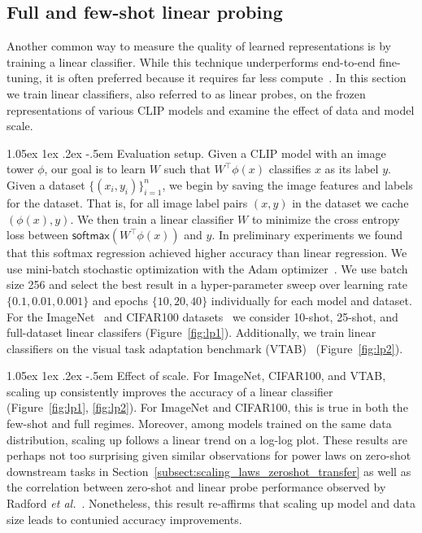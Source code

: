 \documentclass[11pt,table]{article}
\makeatletter
\renewcommand\paragraph{\@startsection{paragraph}{4}{\z@}                                     {1.05ex \@plus1ex \@minus.2ex}                                {-.5em}
{\normalfont\normalsize\bfseries}}
\makeatother
\begin{document}
\subsection{Full and few-shot linear probing}
\label{subsect:scaling_laws_linearprobe}

Another common way to measure the quality of learned representations is by training a linear classifier.
While this technique underperforms end-to-end fine-tuning, it is often preferred because it requires far less compute~\cite{kornblith2019better, radford2021learning}.
In this section we train linear classifiers, also referred to as linear probes, on the frozen representations of various CLIP models and examine the effect of data and model scale.

\paragraph{Evaluation setup.}
Given a CLIP model with an image tower $\phi$, our goal is to learn $W$ such that $W^\top\phi(x)$ classifies $x$ as its label $y$.
Given a dataset $\{(x_i,y_i)\}_{i=1}^n$, we begin by saving the image features and labels for the dataset.
That is, for all image label pairs $(x, y)$ in the dataset we cache $(\phi(x), y)$.
We then train a linear classifier $W$ to minimize the cross entropy loss between $\mathsf{softmax}\left(W^\top \phi(x) \right)$ and $y$.
In preliminary experiments we found that this softmax regression achieved higher accuracy than linear regression.
We use mini-batch stochastic optimization with the Adam optimizer~\cite{kingma2014adam}.
We use batch size 256 and select the best result in a hyper-parameter sweep over learning rate $\{0.1, 0.01, 0.001\}$ and epochs $\{10, 20, 40\}$ individually for each model and dataset.
For the ImageNet~\cite{Deng2009a} and CIFAR100 datasets~\cite{Krizhevsky2009} we consider 10-shot, 25-shot, and full-dataset linear classifers (Figure~\ref{fig:lp1}).
Additionally, we train linear classifiers on the visual task adaptation benchmark (VTAB)~\cite{zhai2019large} (Figure~\ref{fig:lp2}).

\paragraph{Effect of scale.}
For ImageNet, CIFAR100, and VTAB, scaling up consistently improves the accuracy of a linear classifier (Figure~\ref{fig:lp1}, \ref{fig:lp2}).
For ImageNet and CIFAR100, this is true in both the few-shot and full regimes.
Moreover, among models trained on the same data distribution, scaling up follows a linear trend on a log-log plot.
These results are perhaps not too surprising given similar observations for power laws on zero-shot downstream tasks in Section~\ref{subsect:scaling_laws_zeroshot_transfer} as well as the correlation between zero-shot and linear probe performance observed by Radford \textit{et al.}~\cite{radford2021learning}.
Nonetheless, this result re-affirms that scaling up model and data size leads to contunied accuracy improvements.
\end{document}

